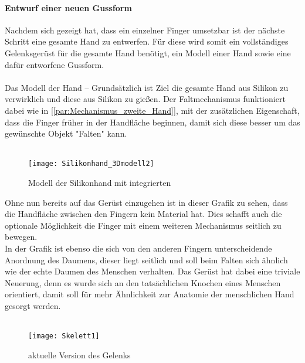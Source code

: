 \documentclass[titlepage,12pt,twoside]{article}
\begin{document}
\paragraph{Entwurf einer neuen Gussform}
\hfill \break
\hfill \break
Nachdem sich gezeigt hat, dass ein einzelner Finger umsetzbar ist der nächste Schritt eine gesamte Hand zu entwerfen. Für diese wird somit ein vollständiges Gelenksgerüst für die gesamte Hand benötigt, ein Modell einer Hand sowie eine dafür entworfene 
Gussform. \\
\\
Das Modell der Hand – Grundsätzlich ist Ziel die gesamte Hand aus Silikon zu verwirklich und diese aus Silikon zu gießen. Der Faltmechanismus funktioniert dabei wie in [\textcolor{blue}{\autoref{par:Mechanismus_zweite_Hand}}], mit der zusätzlichen Eigenschaft, dass die Finger früher 
in der Handfläche beginnen, damit sich diese besser um das gewünschte Objekt "Falten" kann. \\
\\
\begin{figure}[H]
	\begin{center}
		\scalebox{0.8}
		{\texttt{[image: Silikonhand\_3Dmodell2]}}
		\caption{Modell der Silikonhand mit integrierten }
		\label{fig:Silikonhand_3Dmodell2}			
	\end{center}
\end{figure}
\hfill \break
Ohne nun bereits auf das Gerüst einzugehen ist in dieser Grafik zu sehen, dass die Handfläche zwischen den Fingern kein Material hat. Dies schafft auch die optionale Möglichkeit die Finger mit einem weiteren Mechanismus seitlich zu bewegen. \\
In der Grafik ist ebenso die sich von den anderen Fingern unterscheidende Anordnung des Daumens, dieser liegt seitlich und soll beim Falten sich ähnlich wie der echte Daumen des Menschen verhalten.
Das Gerüst hat dabei eine triviale Neuerung, denn es wurde sich an den tatsächlichen Knochen eines Menschen orientiert, damit soll für mehr Ähnlichkeit zur Anatomie der menschlichen Hand gesorgt werden. \\
\\
\begin{figure}[H]
	\begin{center}
		\scalebox{0.8}
		{\texttt{[image: Skelett1]}}
		\caption{aktuelle Version des Gelenks}
		\label{fig:Skelett1}			
	\end{center}
\end{figure}
\end{document}
